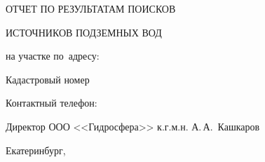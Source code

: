 

\setlength{\extrarowheight}{1mm} %


\begin{titlepage}
	\begin{center}
		\textbf{\txtExecutor}
		\vspace{7.5cm}
		
		{\LARGE ОТЧЕТ ПО РЕЗУЛЬТАТАМ ПОИСКОВ}

		\bigskip

		{\LARGE ИСТОЧНИКОВ ПОДЗЕМНЫХ ВОД}
		
		\bigskip
		
		на участке по~адресу:
		\bigskip
				
		\underline{\txtAddress}
		
		\bigskip
		Кадастровый номер \txtCadaster
		\bigskip

		Контактный телефон: \txtPhoneNumber
		
		\vfill
	
		\bigskip
		
	\end{center}

	\vfill
	
	\newlength{\ML}
	\hfill
	\begin{minipage}{1.0\textwidth}
		Директор ООО <<Гидросфера>> к.г.м.н.
		\underline{\hspace{\ML}} А.\,А.~Кашкаров\\
	\end{minipage}%
	
	\bigskip
	
	\vfill
	\begin{center}
		Екатеринбург, \txtYear
	\end{center}			

	\end{titlepage}

\tableofcontents

\listoffigures


